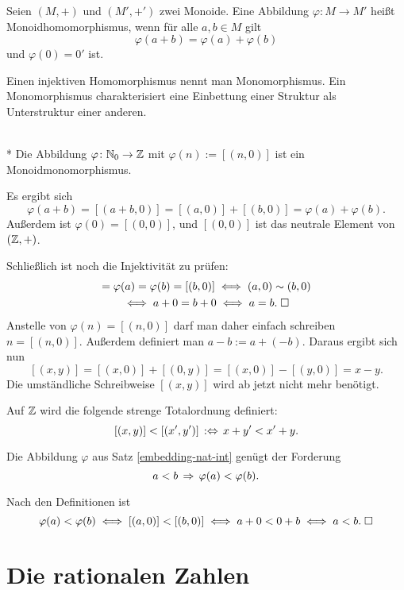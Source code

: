 \begin{Definition}[Monoidhomomorphismus]\newlinefirst
Seien $(M,+)$ und $(M',+')$ zwei Monoide. Eine Abbildung
$\varphi\colon M\to M'$ heißt Monoidhomomorphismus, wenn
für alle $a,b\in M$ gilt
\[\varphi(a+b) = \varphi(a)+\varphi(b)\]
und $\varphi(0)=0'$ ist.
\end{Definition}
Einen injektiven Homomorphismus nennt man Monomorphismus. Ein
Monomorphismus charakterisiert eine Einbettung einer Struktur als
Unterstruktur einer anderen.

\begin{Satz}%
\label{embedding-nat-int}\mbox{}\\*
Die Abbildung $\varphi\colon\mathbb N_0\to\mathbb Z$ mit $\varphi(n):=[(n,0)]$
ist ein Monoidmonomorphismus.
\end{Satz}
 Es ergibt sich
\[\varphi(a+b) = [(a+b,0)] = [(a,0)]+[(b,0)] = \varphi(a)+\varphi(b).\]
Außerdem ist $\varphi(0)=[(0,0)]$, und $[(0,0)]$
ist das neutrale Element von $(\mathbb Z,+)$.

Schließlich ist noch die Injektivität zu prüfen:
\begin{gather*}
[(a,0)] = \varphi(a) = \varphi(b)  = [(b,0)]\iff (a,0)\sim (b,0)\\
\iff a+0 = b+0 \iff a=b.\;\qedsymbol
\end{gather*}
Anstelle von $\varphi(n)=[(n,0)]$ darf man daher einfach schreiben
$n=[(n,0)]$. Außerdem definiert man $a-b:=a+(-b)$. Daraus
ergibt sich nun
\[[(x,y)] = [(x,0)]+[(0,y)] = [(x,0)] - [(y,0)] = x-y.\]
Die umständliche Schreibweise $[(x,y)]$ wird ab jetzt nicht
mehr benötigt.

\begin{Definition}\newlinefirst
Auf $\mathbb Z$ wird die folgende strenge Totalordnung definiert:
\[[(x,y)] < [(x',y')]\,:\Leftrightarrow\, x+y'<x'+y.\]
\end{Definition}

\begin{Satz}\newlinefirst
Die Abbildung $\varphi$ aus Satz \ref{embedding-nat-int}
genügt der Forderung
\[a<b\,\Rightarrow\, \varphi(a)<\varphi(b).\]
\end{Satz}
 Nach den Definitionen ist
\[\varphi(a)<\varphi(b)\iff [(a,0)]<[(b,0)]\iff a+0<0+b\iff a<b.\;\Box\]


\section{Die rationalen Zahlen}

